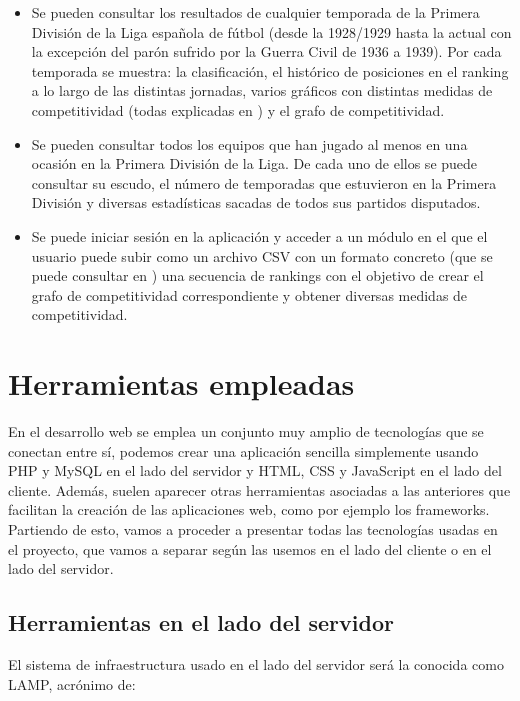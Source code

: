 \begin{itemize}
	\item Se pueden consultar los resultados de cualquier temporada de la Primera División de la Liga española de fútbol (desde la 1928/1929 hasta la actual con la excepción del parón sufrido por la Guerra Civil de 1936 a 1939). Por cada temporada se muestra: la clasificación, el histórico de posiciones en el ranking a lo largo de las distintas jornadas, varios gráficos con distintas medidas de competitividad (todas explicadas en \cite[Capítulo 2]{tfgjose}) y el grafo de competitividad.
	\item Se pueden consultar todos los equipos que han jugado al menos en una ocasión en la Primera División de la Liga. De cada uno de ellos se puede consultar su escudo, el número de temporadas que estuvieron en la Primera División y diversas estadísticas sacadas de todos sus partidos disputados.
	\item Se puede iniciar sesión en la aplicación y acceder a un módulo en el que el usuario puede subir como un archivo CSV con un formato concreto (que se puede consultar en \cite[pág 27]{tfgjose}) una secuencia de rankings con el objetivo de crear el grafo de competitividad correspondiente y obtener diversas medidas de competitividad.
\end{itemize}

\section{Herramientas empleadas}
En el desarrollo web se emplea un conjunto muy amplio de tecnologías que se conectan entre sí, podemos crear una aplicación sencilla simplemente usando PHP y MySQL en el lado del servidor y HTML, CSS y JavaScript en el lado del cliente. Además, suelen aparecer otras herramientas asociadas a las anteriores que facilitan la creación de las aplicaciones web, como por ejemplo los frameworks.\\

Partiendo de esto, vamos a proceder a presentar todas las tecnologías usadas en el proyecto, que vamos a separar según las usemos en el lado del cliente o en el lado del servidor.

\newpage

\subsection{Herramientas en el lado del servidor}
El sistema de infraestructura usado en el lado del servidor será la conocida como LAMP, acrónimo de:

